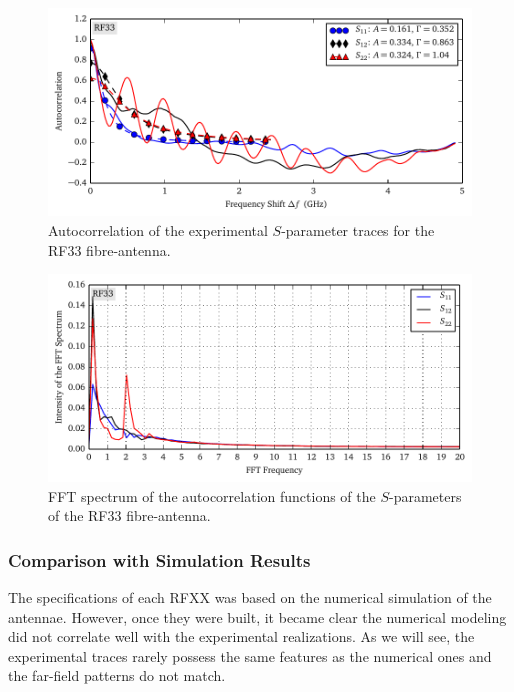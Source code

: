 \begin{figure}
 \centering
 \includegraphics{figs/active/RF33-autoCorrelation.pdf}
 \caption[Autocorrelation of the experimental $S$-parameter traces for the RF33 fibre-antenna]
 		{Autocorrelation of the experimental $S$-parameter traces for the RF33 fibre-antenna.}
 \label{fig:active.lcx.rf33autocorrelation}
\end{figure}

\begin{figure}
 \centering
 \includegraphics{figs/active/RF33-fft.pdf}
 \caption[FFT spectrum of the autocorrelation functions of the $S$-parameters of the RF33 fibre-antenna]
 		{FFT spectrum of the autocorrelation functions of the $S$-parameters of the RF33 fibre-antenna.}
 \label{fig:active.lcx.rf33fft}
\end{figure}


\subsubsection{Comparison with Simulation Results}
The specifications of each RFXX was based on the numerical simulation
of the antennae. However, once they were built, it became clear the 
numerical modeling did not correlate well with the experimental
realizations. As we will see, the experimental traces rarely possess
the same features as the numerical ones and the far-field patterns 
do not match. 

